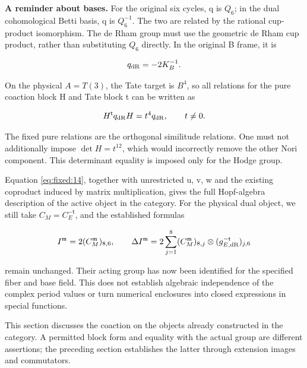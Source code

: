 \documentclass[11pt,a4paper,oneside]{article}
\theoremstyle{plain}
\theoremstyle{definition}
\theoremstyle{remark}
\numberwithin{equation}{section}
\begin{document}
\textbf{A reminder about bases.} For the original six cycles, q is \(Q_6\); in the dual cohomological Betti basis, q is \(Q_6^{-1}\). The two are related by the rational cup-product isomorphism. The de Rham group must use the geometric de Rham cup product, rather than substituting \(Q_6\) directly. In the original B frame, it is

\begin{equation}
q_{\rm dR}=-2K_B^{-1}.
\end{equation}

On the physical \(A=T(3)\), the Tate target is \(B^4\), so all relations for the pure coaction block H and Tate block t can be written as

\begin{equation}
H^{\mathsf t}q_{\rm dR}H=t^4q_{\rm dR},
                  \qquad t\ne0.                                \label{eq:fixed:14}
\end{equation}

The fixed pure relations are the orthogonal similitude relations. One must not additionally impose \(\det H=t^{12}\), which would incorrectly remove the other Nori component. This determinant equality is imposed only for the Hodge group.

Equation \eqref{eq:fixed:14}, together with unrestricted u, v, w and the existing coproduct induced by matrix multiplication, gives the full Hopf-algebra description of the active object in the category. For the physical dual object, we still take \(C_M=C_E^{-\mathsf t}\), and the established formulas

\begin{equation}
I^{\mathfrak m}=2(C_M^{\mathfrak m})_{8,6},\qquad
 \Delta I^{\mathfrak m}
 =2\sum_{j=1}^8(C_M^{\mathfrak m})_{8,j}
       \otimes(g_{E,\rm dR}^{-\mathsf t})_{j,6}
\end{equation}

remain unchanged. Their acting group has now been identified for the specified fiber and base field. This does not establish algebraic independence of the complex period values or turn numerical enclosures into closed expressions in special functions.



\endgroup



\begingroup

This section discusses the coaction on the objects already constructed in the category. A permitted block form and equality with the actual group are different assertions; the preceding section establishes the latter through extension images and commutators.
\end{document}
